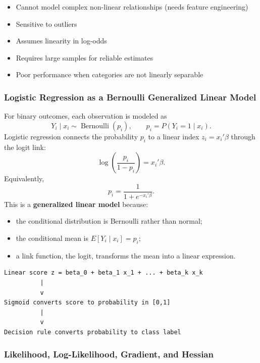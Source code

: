 \documentclass[12pt,openany]{book}
\begin{document}
\begin{itemize}[leftmargin=*]
    \item Cannot model complex non-linear relationships (needs feature engineering)
    \item Sensitive to outliers
    \item Assumes linearity in log-odds
    \item Requires large samples for reliable estimates
    \item Poor performance when categories are not linearly separable

\end{itemize}

\medskip




\subsubsection{Logistic Regression as a Bernoulli Generalized Linear Model}

For binary outcomes, each observation is modeled as
\[
Y_i\mid x_i \sim \operatorname{Bernoulli}(p_i), \qquad p_i=P(Y_i=1\mid x_i).
\]
Logistic regression connects the probability \(p_i\) to a linear index \(z_i=x_i'\beta\) through the logit link:
\[
\log\left(\frac{p_i}{1-p_i}\right)=x_i'\beta.
\]
Equivalently,
\[
p_i=\frac{1}{1+e^{-x_i'\beta}}.
\]
This is a \textbf{generalized linear model} because:
\begin{itemize}[leftmargin=*]
    \item the conditional distribution is Bernoulli rather than normal;
    \item the conditional mean is \(E[Y_i\mid x_i]=p_i\);
    \item a link function, the logit, transforms the mean into a linear expression.
\end{itemize}

\begin{Verbatim}[breaklines=true,fontsize=\small]
Linear score z = beta_0 + beta_1 x_1 + ... + beta_k x_k
          |
          v
Sigmoid converts score to probability in [0,1]
          |
          v
Decision rule converts probability to class label
\end{Verbatim}

\subsubsection{Likelihood, Log-Likelihood, Gradient, and Hessian}
\end{document}
